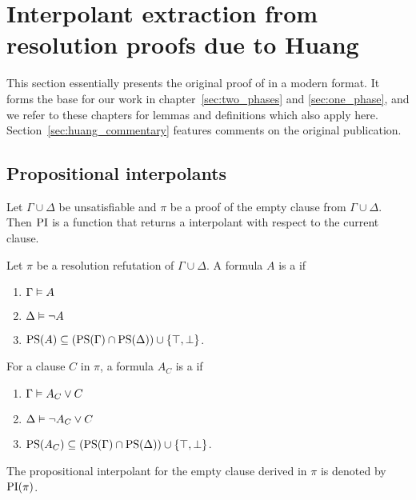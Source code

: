 
\chapter{Interpolant extraction from resolution proofs due to Huang}  
\label{sec:huang}
\label{chap:huang}

This section essentially presents the original proof of \cite{Huang95} in a modern format.
It forms the base for our work in chapter~\ref{sec:two_phases} and \ref{sec:one_phase}, and we refer to these chapters for lemmas and definitions which also apply here.
Section~\ref{sec:huang_commentary} features comments on the original publication. 

\section{Propositional interpolants}


Let $\Gamma \cup \Delta$ be unsatisfiable and $\pi$ be a proof of the empty clause from $\Gamma \cup \Delta$. Then $\operatorname{PI}$ is a function that returns a interpolant with respect to the current clause. 

\begin{defi}
	Let $\pi$ be a resolution refutation of $\Gamma \cup \Delta$.
	A formula $A$ is a  if
	\label{def:huang_orig_rel_prop_interpol}
	\begin{enumerate}
		\item $\Gamma \vDash A$
			\label{huang_orig_rel_prop_interpol_cond1}
		\item $\Delta \vDash \lnot A$
			\label{huang_orig_rel_prop_interpol_cond2}
		\item $\operatorname{PS}(A) \subseteq (\operatorname{PS}(\Gamma) \cap \operatorname{PS}(\Delta)) \cup \{\top, \bot\} $.
			\label{huang_orig_rel_prop_interpol_cond_lang}
	\end{enumerate}


	For a clause $C$ in $\pi$, a formula $A_C$ is a  if
	\begin{enumerate}
		\item $\Gamma \vDash A_C \lor C$
		\item $\Delta \vDash \lnot A_C \lor C$
		\item $\operatorname{PS}(A_C) \subseteq (\operatorname{PS}(\Gamma) \cap \operatorname{PS}(\Delta)) \cup \{\top, \bot\} $.
	\end{enumerate}

	The propositional interpolant for the empty clause derived in $\pi$ is denoted by $\operatorname{PI}(\pi)$.\qedhere
\end{defi}

